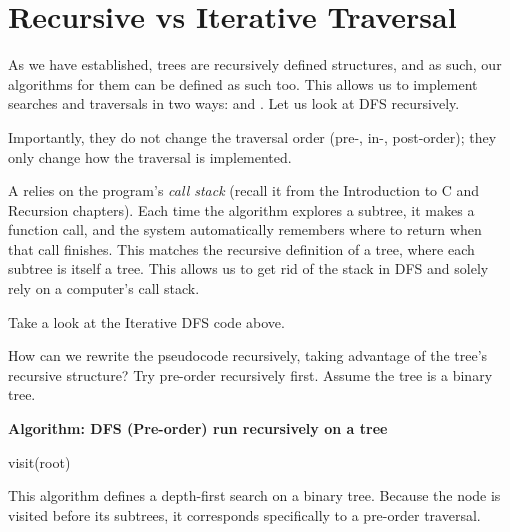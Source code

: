\section{Recursive vs Iterative Traversal}
As we have established, trees are recursively defined structures, and as such, our algorithms for them can be defined as such too. This allows us to implement searches and traversals in two ways:  and . Let us look at DFS recursively.

Importantly, they do not change the traversal order (pre-, in-, post-order); they only change how the traversal is implemented.

A  relies on the program's \emph{call stack} (recall it from the Introduction to C and Recursion chapters). Each time the algorithm explores a subtree, it makes a function call, and the system automatically remembers where to return when that call finishes. This matches the recursive definition of a tree, where each subtree is itself a tree. This allows us to get rid of the stack in DFS and solely rely on a computer's call stack.

\begin{Exercise}[title={Recursive DFS}, label={ex:recur_dfs}]
    Take a look at the Iterative DFS code above.

    How can we rewrite the pseudocode recursively, taking advantage of the tree's recursive structure? Try pre-order recursively first. Assume the tree is a binary tree.
\end{Exercise}



\begin{Answer}[ref={ex:recur_dfs}]

    \noindent\textbf{Algorithm: DFS (Pre-order) run recursively on a tree}

    \begin{algorithmic}
        \State \Return
        \EndIf
        \State visit(root) 
        \State {} 
        \State {} 
        \EndProcedure
    \end{algorithmic}

    This algorithm defines a depth-first search on a binary tree. Because the node is visited before its subtrees, it corresponds specifically to a pre-order traversal.
\end{Answer}

